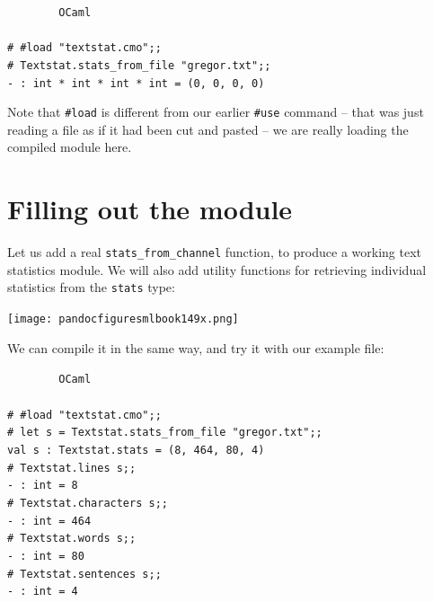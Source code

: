 \documentclass[]{book}
\newcommand{\smspace}{\vspace{4mm}}
\begin{document}
\smspace
\noindent\verb!        OCaml!\\
\noindent\\
\noindent\texttt{\# \#load "textstat.cmo";;}\\
\noindent\texttt{\# Textstat.stats\_from\_file "gregor.txt";;}\\
\noindent\texttt{- :\ int * int * int * int = (0, 0, 0, 0)}\hfill\vphantom{g}
\smspace

\noindent Note that \texttt{\#load} is different from our earlier \texttt{\#use} command -- that was just reading a file as if it had been cut and pasted -- we are really loading the compiled module here.

\section*{Filling out the module}

Let us add a real \texttt{stats\_from\_channel} function, to produce a working text statistics module. We will also add utility functions for retrieving individual statistics from the \texttt{stats} type:

\medskip
\begin{center}
\noindent\texttt{[image: pandocfiguresmlbook149x.png]}
\end{center}
\medskip

\noindent We can compile it in the same way, and try it with our example file:


\smspace
\noindent\verb!        OCaml!\\
\noindent\\
\noindent\texttt{\# \#load "textstat.cmo";;}\\
\noindent\texttt{\# let s = Textstat.stats\_from\_file "gregor.txt";;}\\
\noindent\texttt{val s :\ Textstat.stats = (8, 464, 80, 4)}\\
\noindent\texttt{\# Textstat.lines s;;}\\
\noindent\texttt{- :\ int = 8}\\
\noindent\texttt{\# Textstat.characters s;;}\\
\noindent\texttt{- :\ int = 464}\\
\noindent\texttt{\# Textstat.words s;;}\\
\noindent\texttt{- :\ int = 80}\\
\noindent\texttt{\# Textstat.sentences s;;}\\
\noindent\texttt{- :\ int = 4}\vphantom{g}
\smspace
\end{document}
